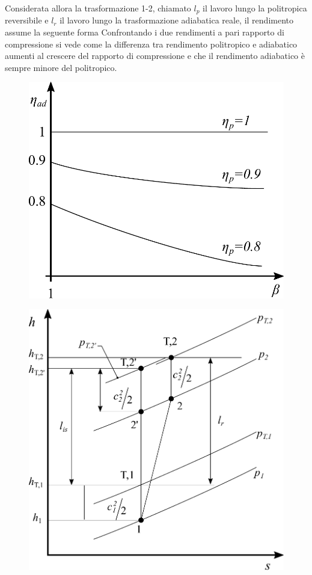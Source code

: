 Considerata allora la trasformazione 1-2, chiamato $l_p$ il lavoro lungo la politropica reversibile e $l_r$ il lavoro lungo la trasformazione adiabatica reale, il rendimento assume la seguente forma
Confrontando i due rendimenti a pari rapporto di compressione si vede come la differenza tra rendimento politropico e adiabatico aumenti al crescere del rapporto di compressione e che il rendimento adiabatico è sempre minore del politropico.
\begin{figure}
\centering
\begin{minipage}{.45\textwidth}
  \centering
  \includegraphics[width=.9\linewidth]{fig/Rend3.pdf}
  \label{fig:Rend3}
\end{minipage}%
\begin{minipage}{.55\textwidth}
  \centering
  \includegraphics[width=.9\linewidth]{fig/Rend4.pdf}

\end{minipage}
\end{figure}
